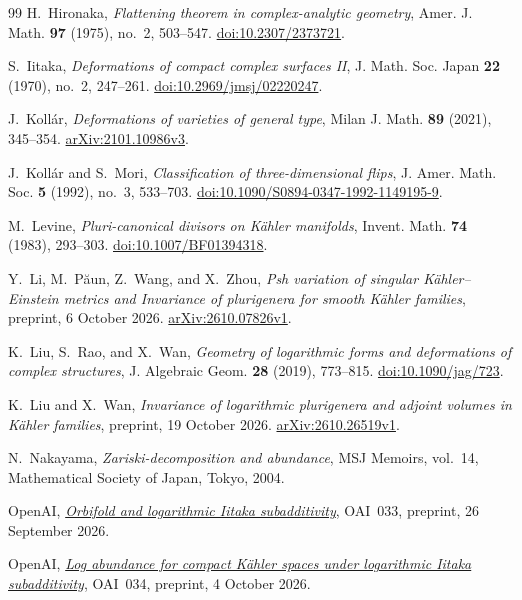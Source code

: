 \documentclass[11pt,a4paper]{article}
\theoremstyle{definition}\newtheorem{definition}[theorem]{Definition}
\theoremstyle{remark}\newtheorem*{remark}{Remark}
\begin{document}
\begin{thebibliography}{99}
H.~Hironaka,
\emph{Flattening theorem in complex-analytic geometry},
Amer. J. Math. \textbf{97} (1975), no.~2, 503--547.
\href{https://doi.org/10.2307/2373721}{doi:10.2307/2373721}.

S.~Iitaka,
\emph{Deformations of compact complex surfaces II},
J. Math. Soc. Japan \textbf{22} (1970), no.~2, 247--261.
\href{https://doi.org/10.2969/jmsj/02220247}{doi:10.2969/jmsj/02220247}.

J.~Kollár,
\emph{Deformations of varieties of general type},
Milan J. Math. \textbf{89} (2021), 345--354.
\href{https://arxiv.org/abs/2101.10986v3}{arXiv:2101.10986v3}.

J.~Kollár and S.~Mori,
\emph{Classification of three-dimensional flips},
J. Amer. Math. Soc. \textbf{5} (1992), no.~3, 533--703.
\href{https://doi.org/10.1090/S0894-0347-1992-1149195-9}{doi:10.1090/S0894-0347-1992-1149195-9}.

M.~Levine,
\emph{Pluri-canonical divisors on Kähler manifolds},
Invent. Math. \textbf{74} (1983), 293--303.
\href{https://doi.org/10.1007/BF01394318}{doi:10.1007/BF01394318}.

Y.~Li, M.~Păun, Z.~Wang, and X.~Zhou,
\emph{Psh variation of singular Kähler--Einstein metrics and
Invariance of plurigenera for smooth Kähler families},
preprint, 6 October 2026.
\href{https://arxiv.org/abs/2610.07826v1}{arXiv:2610.07826v1}.

K.~Liu, S.~Rao, and X.~Wan,
\emph{Geometry of logarithmic forms and deformations of complex structures},
J. Algebraic Geom. \textbf{28} (2019), 773--815.
\href{https://doi.org/10.1090/jag/723}{doi:10.1090/jag/723}.

K.~Liu and X.~Wan,
\emph{Invariance of logarithmic plurigenera and adjoint volumes
in Kähler families},
preprint, 19 October 2026.
\href{https://arxiv.org/abs/2610.26519v1}{arXiv:2610.26519v1}.

N.~Nakayama,
\emph{Zariski-decomposition and abundance},
MSJ Memoirs, vol.~14, Mathematical Society of Japan, Tokyo, 2004.

OpenAI,
\href{https://github.com/openai/math/tree/4eaee87548250b2682affda7d05d947c05554bae/preprints/Orbifold-and-logarithmic-Iitaka-subadditivity-September-26-2026}{\emph{Orbifold and logarithmic Iitaka subadditivity}},
OAI~033, preprint, 26 September 2026.

OpenAI,
\href{https://github.com/openai/math/tree/4eaee87548250b2682affda7d05d947c05554bae/preprints/Log-abundance-for-compact-Kahler-spaces-under-logarithmic-Iitaka-subadditivity-October-4-2026}{\emph{Log abundance for compact Kähler spaces under logarithmic Iitaka subadditivity}},
OAI~034, preprint, 4 October 2026.


\end{thebibliography}
\end{document}
